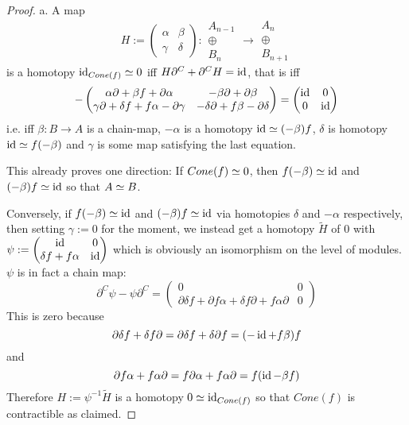 \documentclass[fontsize=11pt,fleqn,a4paper]{scrartcl}
\begin{document}
\begin{proof}
a. A map
\[H:=\begin{pmatrix}
\alpha & \beta \\ \gamma & \delta
\end{pmatrix} : \begin{array}{c}A_{n-1}\\\oplus\\B_n\end{array} \to \begin{array}{c}A_n \\\oplus\\ B_{n+1}\end{array}\]
is a homotopy $\operatorname{id}_{Cone(f)} \simeq 0$ iff $H\partial^{C} + \partial^{C} H = \operatorname{id}$, that is iff
\[-\begin{pmatrix}
\alpha\partial + \beta f + \partial\alpha & -\beta\partial + \partial\beta \\
\gamma\partial + \delta f + f\alpha-\partial\gamma & -\delta\partial + f\beta - \partial\delta
\end{pmatrix} = \begin{pmatrix}
\operatorname{id} & 0 \\ 0 & \operatorname{id}
\end{pmatrix}\]
i.e. iff $\beta: B\to A$ is a chain-map, $-\alpha$ is a homotopy $\operatorname{id}\simeq(-\beta) f$, $\delta$ is homotopy $\operatorname{id}\simeq f(-\beta)$ and $\gamma$ is some map satisfying the last equation.

This already proves one direction: If $Cone(f) \simeq 0$, then $f(-\beta) \simeq \operatorname{id}$ and $(-\beta) f \simeq\operatorname{id}$ so that $A\simeq B$.

\medbreak
Conversely, if $f(-\beta) \simeq \operatorname{id}$ and $(-\beta)f \simeq \operatorname{id}$ via homotopies $\delta$ and $-\alpha$ respectively, then setting $\gamma:=0$ for the moment, we instead get a homotopy $\tilde{H}$ of $0$ with $\psi:=\begin{pmatrix}
\operatorname{id} & 0 \\ \delta f + f\alpha & \operatorname{id}
\end{pmatrix}$ which is obviously an isomorphism on the level of modules. $\psi$ is in fact a chain map:
\[\partial^{C} \psi - \psi \partial^{C} = \begin{pmatrix}
0 & 0 \\ \partial\delta f + \partial f\alpha + \delta f\partial + f\alpha\partial & 0
\end{pmatrix}\]
This is zero because
\[\partial\delta f + \delta f \partial = \partial\delta f + \delta \partial f = (-\operatorname{id}+f\beta)f\]
and
\[\partial f \alpha + f\alpha\partial = f\partial\alpha+f\alpha\partial = f(\operatorname{id}-\beta f)\]
Therefore $H:=\psi^{-1}\tilde{H}$ is a homotopy $0\simeq \operatorname{id}_{Cone(f)}$ so that $Cone(f)$ is contractible as claimed.


\end{proof}
\end{document}
